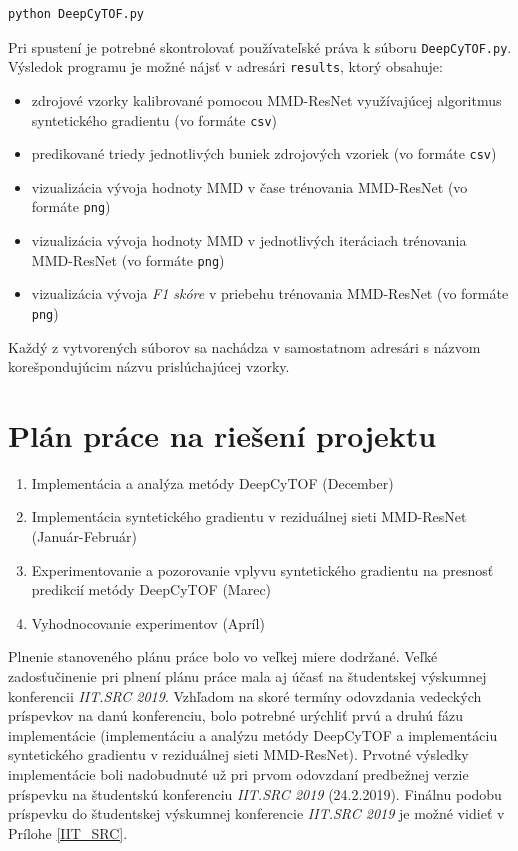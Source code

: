 \begin{Verbatim}[breaklines=true, breakanywhere=true]
python DeepCyTOF.py
\end{Verbatim}

Pri spustení je potrebné skontrolovať používateľské práva k súboru \texttt{DeepCyTOF.py}. Výsledok programu je možné nájsť v adresári \texttt{results}, ktorý obsahuje:

\begin{itemize}
    \item zdrojové vzorky kalibrované pomocou MMD-ResNet využívajúcej algoritmus syntetického gradientu (vo formáte \texttt{csv})
    \item predikované triedy jednotlivých buniek zdrojových vzoriek (vo formáte \texttt{csv})
    \item vizualizácia vývoja hodnoty MMD v čase trénovania MMD-ResNet (vo formáte \texttt{png})
    \item vizualizácia vývoja hodnoty MMD v jednotlivých iteráciach trénovania MMD-ResNet (vo formáte \texttt{png})
    \item vizualizácia vývoja \textit{F1 skóre} v priebehu trénovania MMD-ResNet (vo formáte \texttt{png})
\end{itemize}

Každý z vytvorených súborov sa nachádza v samostatnom adresári s názvom korešpondujúcim názvu prislúchajúcej vzorky.

\chapter{Plán práce na riešení projektu}
\begin{enumerate}
    \item Implementácia a analýza metódy DeepCyTOF (December)
    \item Implementácia syntetického gradientu v reziduálnej sieti MMD-ResNet (Január-Február)
    \item Experimentovanie a pozorovanie vplyvu syntetického gradientu na presnosť predikcií metódy DeepCyTOF (Marec)
    \item Vyhodnocovanie experimentov (Apríl)
\end{enumerate}

Plnenie stanoveného plánu práce bolo vo veľkej miere dodržané. Veľké zadosťučinenie pri plnení plánu práce mala aj účasť na študentskej výskumnej konferencii \textit{IIT.SRC 2019}. Vzhľadom na skoré termíny odovzdania vedeckých príspevkov na danú konferenciu, bolo potrebné urýchliť prvú a druhú fázu implementácie (implementáciu a analýzu metódy DeepCyTOF a implementáciu syntetického gradientu v reziduálnej sieti MMD-ResNet). Prvotné výsledky implementácie boli nadobudnuté už pri prvom odovzdaní predbežnej verzie príspevku na študentskú konferenciu \textit{IIT.SRC 2019} (24.2.2019). Finálnu podobu príspevku do študentskej výskumnej konferencie \textit{IIT.SRC 2019} je možné vidieť v Prílohe \ref{IIT_SRC}.


